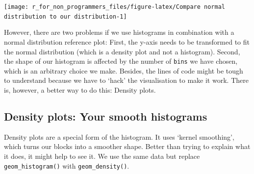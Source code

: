 \documentclass[
]{book}
\newenvironment{Shaded}{\begin{snugshade}}{\end{snugshade}}
\newcommand{\AttributeTok}[1]{\textcolor[rgb]{0.77,0.63,0.00}{#1}}
\newcommand{\CommentTok}[1]{\textcolor[rgb]{0.56,0.35,0.01}{\textit{#1}}}
\newcommand{\DecValTok}[1]{\textcolor[rgb]{0.00,0.00,0.81}{#1}}
\newcommand{\FunctionTok}[1]{\textcolor[rgb]{0.00,0.00,0.00}{#1}}
\newcommand{\NormalTok}[1]{#1}
\newcommand{\SpecialCharTok}[1]{\textcolor[rgb]{0.00,0.00,0.00}{#1}}
\newcommand{\StringTok}[1]{\textcolor[rgb]{0.31,0.60,0.02}{#1}}
\begin{document}
\begin{Shaded}
\end{Shaded}

\begin{center}\texttt{[image: r\_for\_non\_programmers\_files/figure-latex/Compare normal distribution to our distribution-1]} \end{center}

However, there are two problems if we use histograms in combination with a normal distribution reference plot: First, the y-axis needs to be transformed to fit the normal distribution (which is a density plot and not a histogram). Second, the shape of our histogram is affected by the number of \texttt{bins} we have chosen, which is an arbitrary choice we make. Besides, the lines of code might be tough to understand because we have to `hack' the visualisation to make it work. There is, however, a better way to do this: Density plots.

\hypertarget{density-plots-your-smooth-histograms}{%
\subsection{Density plots: Your smooth histograms}\label{density-plots-your-smooth-histograms}}

Density plots are a special form of the histogram. It uses `kernel smoothing', which turns our blocks into a smoother shape. Better than trying to explain what it does, it might help to see it. We use the same data but replace \texttt{geom\_histogram()} with \texttt{geom\_density()}.
\end{document}
